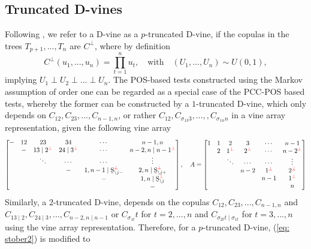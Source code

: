 \documentclass[harvard,11pt]{article}
\begin{document}
\subsection{Truncated D-vines \label{Truncated D-vines}}
{}
Following \citet{joe2014dependence}, we refer to a D-vine as a $p$-truncated D-vine, if the copulas in the trees $T_{p+1},...,T_{n}$ are $C^{\perp}$, where by definition
\[
C^{\perp}\left(u_1,...,u_n\right)=\prod\limits_{t=1}^{n}u_t,\quad\text{with}\quad (U_1,...,U_n)\sim U(0,1), 
\]
implying $U_1\perp U_2 \perp ... \perp U_n$. The POS-based tests constructed using the Markov assumption of order one can be regarded as a special case of the PCC-POS based tests, whereby the former can be constructed by a $1$-truncated D-vine, which only depends on $C_{12},C_{23},...,C_{n-1,n}$, or rather $C_{12},C_{\sigma_{13}3},...,,C_{\sigma_{1n}n}$ in a vine array representation, given the following vine array
\begin{equation*}
\begin{bmatrix}
- & 12 & 23 &34 &\cdots & n-1,n\\
 &-&13\mid2^{\textcolor{red}{\perp}}&24\mid 3^{\textcolor{red}{\perp}}&\cdots&n-2,n\mid n-1^{\textcolor{red}{\perp}}\\
& & \ddots&\cdots&\cdots&\vdots\\
&&&-&1,n-1\mid \text{\b{S}}_{\backslash j-}^{\textcolor{red}{\perp}}&2,n \mid \text{\b{S}}_{\backslash j+}^{\textcolor{red}{\perp}}\\
&&&&-&1,n\mid \text{\b{S}}_{\backslash j}^{\textcolor{red}{\perp}}\\
&&&&&-
\end{bmatrix},\quad
A=
\begin{bmatrix}
1 & 1 & 2 &3 &\cdots & n-1\\
 &2&1^{\textcolor{red}{\perp}}&2^{\textcolor{red}{\perp}}&\cdots&n-2^{\textcolor{red}{\perp}}\\
& & \ddots&\cdots&\cdots&\vdots\\
&&&n-2&1^{\textcolor{red}{\perp}}&2^{\textcolor{red}{\perp}}\\
&&&&n-1&1^{\textcolor{red}{\perp}}\\
&&&&&n
\end{bmatrix}
\end{equation*}
Similarly, a $2$-truncated D-vine, depends on the copulas $C_{12},C_{23},...,C_{n-1,n}$ and $C_{13\mid 2},C_{24\mid 3},...,C_{n-2,n\mid n-1}$ or $C_{\sigma_{1t}}t$ for $t=2,...,n$ and $C_{\sigma_{2t}t\mid\sigma_{1t}}$ for $t=3,...,n$ using the vine array representation. Therefore, for a $p$-truncated D-vine, (\ref{eq: stober2}) is modified to 
\end{document}

